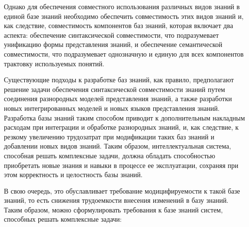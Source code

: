 Однако для обеспечения совместного использования различных видов знаний в единой базе знаний необходимо обеспечить совместимость этих видов знаний и, как следствие, совместимость компонентов баз знаний, которая включает два аспекта: обеспечение синтаксической совместимости, что подразумевает унификацию формы представления знаний, и обеспечение семантической совместимости, что подразумевает однозначную и единую для всех компонентов трактовку используемых понятий.

Существующие подходы к разработке баз знаний, как правило, предполагают решение задачи обеспечения синтаксической совместимости знаний путем соединения разнородных моделей представления знаний, а также разработки новых интегрированных моделей и новых языков представления знаний.
Разработка базы знаний таким способом приводит к дополнительным накладным расходам при интеграции и обработке разнородных знаний, и, как следствие, к резкому увеличению трудозатрат при модификации таких баз знаний и добавлении новых видов знаний.
Таким образом, интеллектуальная система, способная решать комплексные задачи, должна обладать способностью приобретать новые знания и навыки в процессе ее эксплуатации, сохраняя при этом корректность и целостность базы знаний.

В свою очередь, это обуславливает требование модицифируемости к такой базе знаний, то есть снижения трудоемкости внесения изменений в базу знаний.
Таким образом, можно сформулировать требования к базе знаний систем, способных решать комплексные задачи:

